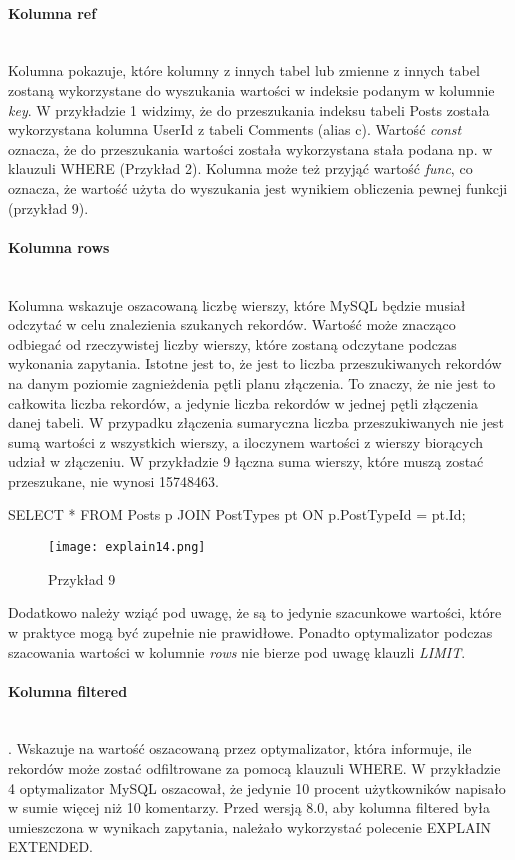 \paragraph{Kolumna ref}\leavevmode\\
Kolumna pokazuje, które kolumny z innych tabel lub zmienne z innych tabel zostaną wykorzystane do wyszukania wartości w indeksie podanym w kolumnie \textit{key}. W przykładzie 1 widzimy, że do przeszukania indeksu tabeli Posts została wykorzystana kolumna UserId z tabeli Comments (alias c). Wartość \textit{const} oznacza, że do przeszukania wartości została wykorzystana stała podana np. w klauzuli WHERE (Przykład 2). Kolumna może też przyjąć wartość \textit{func}, co oznacza, że wartość użyta do wyszukania jest wynikiem obliczenia pewnej funkcji (przykład 9).

\paragraph{Kolumna rows}\leavevmode\\
Kolumna wskazuje oszacowaną liczbę wierszy, które MySQL będzie musiał odczytać w celu znalezienia szukanych rekordów. Wartość może znacząco odbiegać od rzeczywistej liczby wierszy, które zostaną odczytane podczas wykonania zapytania. Istotne jest to, że jest to liczba przeszukiwanych rekordów na danym poziomie zagnieżdenia pętli planu złączenia. To znaczy, że nie jest to całkowita liczba rekordów, a jedynie liczba rekordów w jednej pętli złączenia danej tabeli. W przypadku złączenia sumaryczna liczba przeszukiwanych nie jest sumą wartości z wszystkich wierszy, a iloczynem wartości z wierszy biorących udział w złączeniu. W przykładzie 9 łączna suma wierszy, które muszą zostać przeszukane, nie wynosi 15748463.
\begin{spverbatim}
	SELECT * FROM Posts p JOIN PostTypes pt ON p.PostTypeId = pt.Id;
\end{spverbatim}
\begin{figure}[H]
	\texttt{[image: explain14.png]} 
	\caption{Przykład 9}
\end{figure}
Dodatkowo należy wziąć pod uwagę, że są to jedynie szacunkowe wartości, które w praktyce mogą być zupełnie nie prawidłowe. Ponadto optymalizator podczas szacowania wartości w kolumnie \textit{rows} nie bierze pod uwagę klauzli \textit{LIMIT}.

\paragraph{Kolumna filtered}\leavevmode\\. Wskazuje na wartość oszacowaną przez optymalizator, która informuje, ile rekordów może zostać odfiltrowane za pomocą klauzuli WHERE. W przykładzie 4 optymalizator MySQL oszacował, że jedynie 10 procent użytkowników napisało w sumie więcej niż 10 komentarzy. Przed wersją 8.0, aby kolumna filtered była umieszczona w wynikach zapytania, należało wykorzystać polecenie EXPLAIN EXTENDED.

